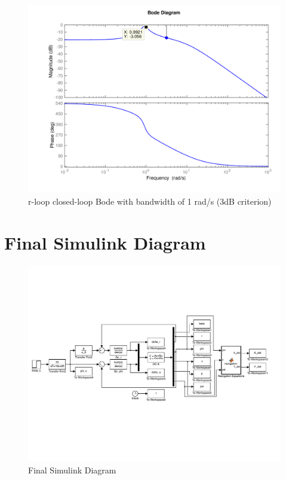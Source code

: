\documentclass[12pt]{article}
\begin{document}
\begin{figure}[h!]
\begin{center}
\includegraphics[height=.375\textheight]{figures/r_delta_r_closed_loop}
\caption{r-loop closed-loop Bode with bandwidth of 1 rad/s (3dB criterion)}
\end{center}
\end{figure}

\clearpage
\section{Final Simulink Diagram}
\begin{figure}[h!]
\begin{center}
\includegraphics[width=1\textwidth]{figures/final_simulink}
\caption{Final Simulink Diagram}
\end{center}
\end{figure}
\end{document}
